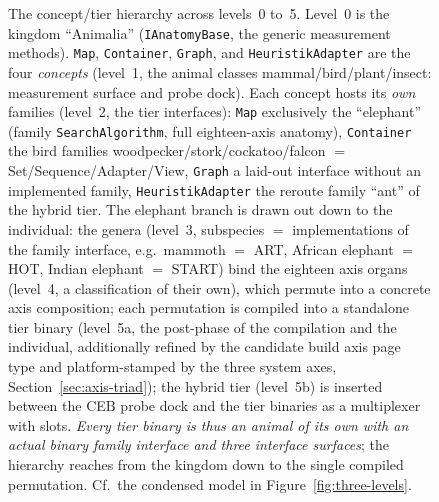 \begin{nurkurz}
\begin{figure}[htbp]
\caption[The four concepts and the tier hierarchy down to the compiled binary]{The concept/tier hierarchy across levels~0 to~5. Level~0 is the kingdom \enquote{Animalia} (\texttt{IAnatomyBase}, the generic measurement methods). \texttt{Map}, \texttt{Container}, \texttt{Graph}, and \texttt{HeuristikAdapter} are the four \emph{concepts} (level~1, the animal classes mammal/bird/plant/insect: measurement surface and probe dock). Each concept hosts its \emph{own} families (level~2, the tier interfaces): \texttt{Map} exclusively the \enquote{elephant} (family \texttt{SearchAlgorithm}, full eighteen-axis anatomy), \texttt{Container} the bird families woodpecker/stork/cockatoo/falcon $=$ Set/Sequence/Adapter/View, \texttt{Graph} a laid-out interface without an implemented family, \texttt{HeuristikAdapter} the reroute family \enquote{ant} of the hybrid tier. The elephant branch is drawn out down to the individual: the genera (level~3, subspecies $=$ implementations of the family interface, e.g.\ mammoth $=$ ART, African elephant $=$ HOT, Indian elephant $=$ START) bind the eighteen axis organs (level~4, a classification of their own), which permute into a concrete axis composition; each permutation is compiled into a standalone tier binary (level~5a, the post-phase of the compilation and the individual, additionally refined by the candidate build axis page type and platform-stamped by the three system axes, Section~\ref{sec:axis-triad}); the hybrid tier (level~5b) is inserted between the CEB probe dock and the tier binaries as a multiplexer with slots\@. \emph{Every tier binary is thus an animal of its own with an actual binary family interface and three interface surfaces}; the hierarchy reaches from the kingdom down to the single compiled permutation. Cf.\ the condensed model in Figure~\ref{fig:three-levels}.}\label{fig:genera}
\end{figure}
\end{nurkurz}


